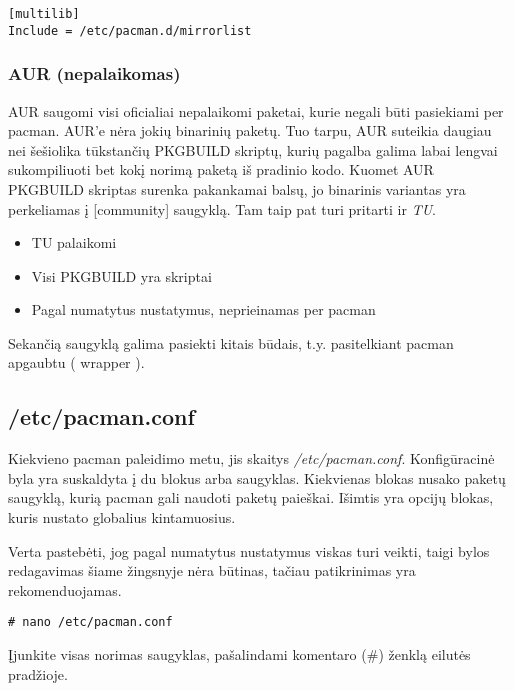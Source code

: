         \begin{verbatim}
[multilib]
Include = /etc/pacman.d/mirrorlist
        \end{verbatim}

      \subsubsection{AUR (nepalaikomas)}

        AUR saugomi visi oficialiai nepalaikomi paketai, kurie negali
        būti pasiekiami per pacman. AUR'e nėra jokių binarinių
        paketų. Tuo tarpu, AUR suteikia daugiau nei šešiolika
        tūkstančių PKGBUILD skriptų, kurių pagalba galima labai
        lengvai sukompiliuoti bet kokį norimą paketą iš pradinio
        kodo. Kuomet AUR PKGBUILD skriptas surenka pakankamai balsų,
        jo binarinis variantas yra perkeliamas į [community]
        saugyklą. Tam taip pat turi pritarti ir \textsl{TU}.

        \begin{itemize}
          \item TU palaikomi
          \item Visi PKGBUILD yra skriptai
          \item Pagal numatytus nustatymus, neprieinamas per pacman
        \end{itemize}

        Sekančią saugyklą galima pasiekti kitais būdais,
        t.y. pasitelkiant pacman apgaubtu ( wrapper ).

    \subsection{/etc/pacman.conf}

      Kiekvieno pacman paleidimo metu, jis skaitys
      \textsl{/etc/pacman.conf}. Konfigūracinė byla yra suskaldyta į
      du blokus arba saugyklas. Kiekvienas blokas nusako paketų
      saugyklą, kurią pacman gali naudoti paketų paieškai. Išimtis yra
      opcijų blokas, kuris nustato globalius kintamuosius.

      Verta pastebėti, jog pagal numatytus nustatymus viskas turi
      veikti, taigi bylos redagavimas šiame žingsnyje nėra būtinas,
      tačiau patikrinimas yra rekomenduojamas. 

      \begin{verbatim}
# nano /etc/pacman.conf
      \end{verbatim}

      Įjunkite visas norimas saugyklas, pašalindami komentaro ($\#$)
      ženklą eilutės pradžioje.

